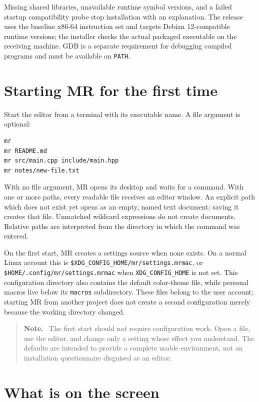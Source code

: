 \documentclass[a4paper,10pt,twoside,openany]{book}
\newcommand{\mr}{\textsc{MR}}
\newenvironment{usernote}{\begin{quote}\small\textbf{Note.}\ }{\end{quote}}
\begin{document}
Missing shared libraries, unavailable runtime symbol versions, and a failed
startup compatibility probe stop installation with an explanation. The release
uses the baseline x86-64 instruction set and targets Debian 12-compatible
runtime versions; the installer checks the actual packaged executable on the
receiving machine. GDB is a separate requirement for debugging compiled
programs and must be available on \texttt{PATH}.
\section{Starting \mr{} for the first time}

Start the editor from a terminal with its executable name. A file argument is
optional:
\begin{verbatim}
mr
mr README.md
mr src/main.cpp include/main.hpp
mr notes/new-file.txt
\end{verbatim}
With no file argument, \mr{} opens its desktop and waits for a command. With
one or more paths, every readable file receives an editor window. An explicit
path which does not exist yet opens as an empty, named text document; saving
it creates that file. Unmatched wildcard expressions do not create documents.
Relative paths are interpreted from the directory in which the command was
entered.

On the first start, \mr{} creates a settings source when none exists. On a
normal Linux account this is
\texttt{\$XDG\_CONFIG\_HOME/mr/settings.mrmac}, or
\texttt{\$HOME/.config/mr/settings.mrmac} when
\texttt{XDG\_CONFIG\_HOME} is not set. This configuration directory also
contains the default color-theme file, while personal macros live below its
\texttt{macros} subdirectory. These files belong to the user account; starting
\mr{} from another project does not create a second configuration merely
because the working directory changed.

\begin{usernote}
The first start should not require configuration work. Open a file, use the
editor, and change only a setting whose effect you understand. The defaults
are intended to provide a complete usable environment, not an installation
questionnaire disguised as an editor.
\end{usernote}

\section{What is on the screen}
\end{document}
